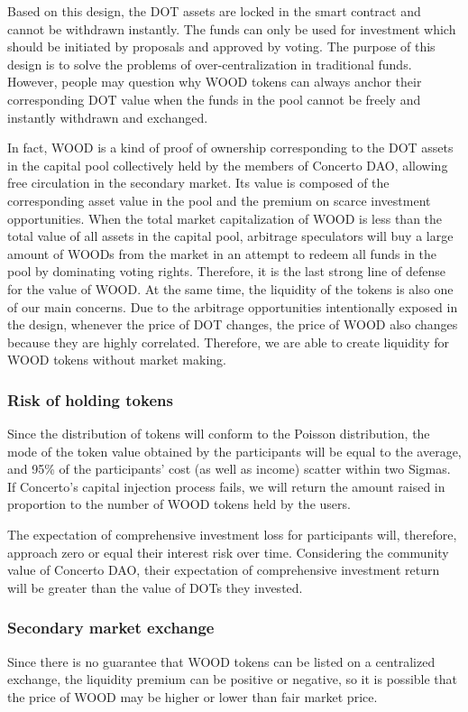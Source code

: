 \documentclass[UTF8]{article}
\begin{document}
\begin{multicols}{2}
Based on this design, the DOT assets are locked in the smart contract and cannot be withdrawn instantly. The funds can only be used for investment which should be initiated by proposals and approved by voting. The purpose of this design is to solve the problems of over-centralization in traditional funds. However, people may question why WOOD tokens can always anchor their corresponding DOT value when the funds in the pool cannot be freely and instantly withdrawn and exchanged.

In fact, WOOD is a kind of proof of ownership corresponding to the DOT assets in the capital pool collectively held by the members of Concerto DAO, allowing free circulation in the secondary market. Its value is composed of the corresponding asset value in the pool and the premium on scarce investment opportunities. When the total market capitalization of WOOD is less than the total value of all assets in the capital pool, arbitrage speculators will buy a large amount of WOODs from the market in an attempt to redeem all funds in the pool by dominating voting rights. Therefore, it is the last strong line of defense for the value of WOOD. At the same time, the liquidity of the tokens is also one of our main concerns. Due to the arbitrage opportunities intentionally exposed in the design, whenever the price of DOT changes, the price of WOOD also changes because they are highly correlated. Therefore, we are able to create liquidity for WOOD tokens without market making.

\subsubsection{Risk of holding tokens}
Since the distribution of tokens will conform to the Poisson distribution, the mode of the token value obtained by the participants will be equal to the average, and 95\% of the participants’ cost (as well as income) scatter within two Sigmas. If Concerto’s capital injection process fails, we will return the amount raised in proportion to the number of WOOD tokens held by the users.

The expectation of comprehensive investment loss for participants will, therefore, approach zero or equal their interest risk over time. Considering the community value of Concerto DAO, their expectation of comprehensive investment return will be greater than the value of DOTs they invested.

\subsubsection{Secondary market exchange}
Since there is no guarantee that WOOD tokens can be listed on a centralized exchange, the liquidity premium can be positive or negative, so it is possible that the price of WOOD may be higher or lower than fair market price.


\end{multicols}
\end{document}
